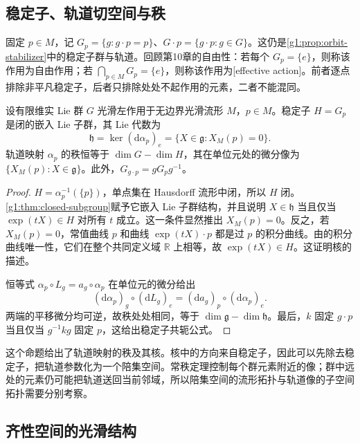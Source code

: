 \subsection{稳定子、轨道切空间与秩}
\label{g1:subsec:1701:02}

固定 \(p\in M\)，记 \(G_p=\{g:g\cdot p=p\}\)、\(G\cdot p=\{g\cdot p:g\in G\}\)。这仍是\cref{g1:prop:orbit-stabilizer}中的稳定子群与轨道。回顾第10章的自由性：若每个 \(G_p=\{e\}\)，则称该作用为自由作用；若 \(\bigcap_{p\in M}G_p=\{e\}\)，则称该作用为[effective action]。前者逐点排除非平凡稳定子，后者只排除处处不起作用的元素，二者不能混同。

\begin{proposition}\label{g1:prop:orbit-map-rank}
	设有限维实 Lie 群 \(G\) 光滑左作用于无边界光滑流形 \(M\)，\(p\in M\)。稳定子 \(H=G_p\) 是闭的嵌入 Lie 子群，其 Lie 代数为
	\begin{equation}\label{g1:eq:stabilizer-lie-algebra}
		\mathfrak h=\ker(\mathrm{d}\alpha_p)_e
		=\{X\in\mathfrak g:X_M(p)=0\}.
	\end{equation}
	轨道映射 \(\alpha_p\) 的秩恒等于 \(\dim G-\dim H\)，其在单位元处的微分像为 \(\{X_M(p):X\in\mathfrak g\}\)。此外，\(G_{g\cdot p}=gG_pg^{-1}\)。
\end{proposition}
\begin{proof}
	\(H=\alpha_p^{-1}(\{p\})\)，单点集在 Hausdorff 流形中闭，所以 \(H\) 闭。\cref{g1:thm:closed-subgroup}赋予它嵌入 Lie 子群结构，并且说明 \(X\in\mathfrak h\) 当且仅当 \(\exp(tX)\in H\) 对所有 \(t\) 成立。这一条件显然推出 \(X_M(p)=0\)。反之，若 \(X_M(p)=0\)，常值曲线 \(p\) 和曲线 \(\exp(tX)\cdot p\) 都是过 \(p\) 的积分曲线。由的积分曲线唯一性，它们在整个共同定义域 \(\mathbb R\) 上相等，故 \(\exp(tX)\in H\)。这证明核的描述。

	恒等式 \(\alpha_p\circ L_g=a_g\circ\alpha_p\) 在单位元的微分给出
	\[
		(\mathrm{d}\alpha_p)_g\circ(\mathrm{d}L_g)_e
		=(\mathrm{d}a_g)_p\circ(\mathrm{d}\alpha_p)_e.
	\]
	两端的平移微分均可逆，故秩处处相同，等于 \(\dim\mathfrak g-\dim\mathfrak h\)。最后，\(k\) 固定 \(g\cdot p\) 当且仅当 \(g^{-1}kg\) 固定 \(p\)，这给出稳定子共轭公式。
\end{proof}

这个命题给出了轨道映射的秩及其核。核中的方向来自稳定子，因此可以先除去稳定子，把轨道参数化为一个陪集空间。常秩定理控制每个群元素附近的像；群中远处的元素仍可能把轨道送回当前邻域，所以陪集空间的流形拓扑与轨道像的子空间拓扑需要分别考察。

\subsection{齐性空间的光滑结构}
\label{g1:subsec:1701:03}

